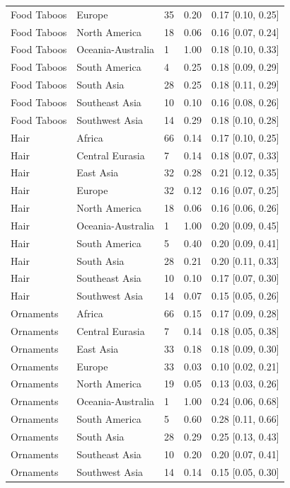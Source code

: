 \begin{longtable}{lllll}
Food Taboos & Europe & 35 & 0.20 & 0.17 [0.10, 0.25] \\
Food Taboos & North America & 18 & 0.06 & 0.16 [0.07, 0.24] \\
Food Taboos & Oceania-Australia & 1 & 1.00 & 0.18 [0.10, 0.33] \\
Food Taboos & South America & 4 & 0.25 & 0.18 [0.09, 0.29] \\
Food Taboos & South Asia & 28 & 0.25 & 0.18 [0.11, 0.29] \\
Food Taboos & Southeast Asia & 10 & 0.10 & 0.16 [0.08, 0.26] \\
Food Taboos & Southwest Asia & 14 & 0.29 & 0.18 [0.10, 0.28] \\
Hair & Africa & 66 & 0.14 & 0.17 [0.10, 0.25] \\
Hair & Central Eurasia & 7 & 0.14 & 0.18 [0.07, 0.33] \\
Hair & East Asia & 32 & 0.28 & 0.21 [0.12, 0.35] \\
Hair & Europe & 32 & 0.12 & 0.16 [0.07, 0.25] \\
Hair & North America & 18 & 0.06 & 0.16 [0.06, 0.26] \\
Hair & Oceania-Australia & 1 & 1.00 & 0.20 [0.09, 0.45] \\
Hair & South America & 5 & 0.40 & 0.20 [0.09, 0.41] \\
Hair & South Asia & 28 & 0.21 & 0.20 [0.11, 0.33] \\
Hair & Southeast Asia & 10 & 0.10 & 0.17 [0.07, 0.30] \\
Hair & Southwest Asia & 14 & 0.07 & 0.15 [0.05, 0.26] \\
Ornaments & Africa & 66 & 0.15 & 0.17 [0.09, 0.28] \\
Ornaments & Central Eurasia & 7 & 0.14 & 0.18 [0.05, 0.38] \\
Ornaments & East Asia & 33 & 0.18 & 0.18 [0.09, 0.30] \\
Ornaments & Europe & 33 & 0.03 & 0.10 [0.02, 0.21] \\
Ornaments & North America & 19 & 0.05 & 0.13 [0.03, 0.26] \\
Ornaments & Oceania-Australia & 1 & 1.00 & 0.24 [0.06, 0.68] \\
Ornaments & South America & 5 & 0.60 & 0.28 [0.11, 0.66] \\
Ornaments & South Asia & 28 & 0.29 & 0.25 [0.13, 0.43] \\
Ornaments & Southeast Asia & 10 & 0.20 & 0.20 [0.07, 0.41] \\
Ornaments & Southwest Asia & 14 & 0.14 & 0.15 [0.05, 0.30] \\

\end{longtable}
